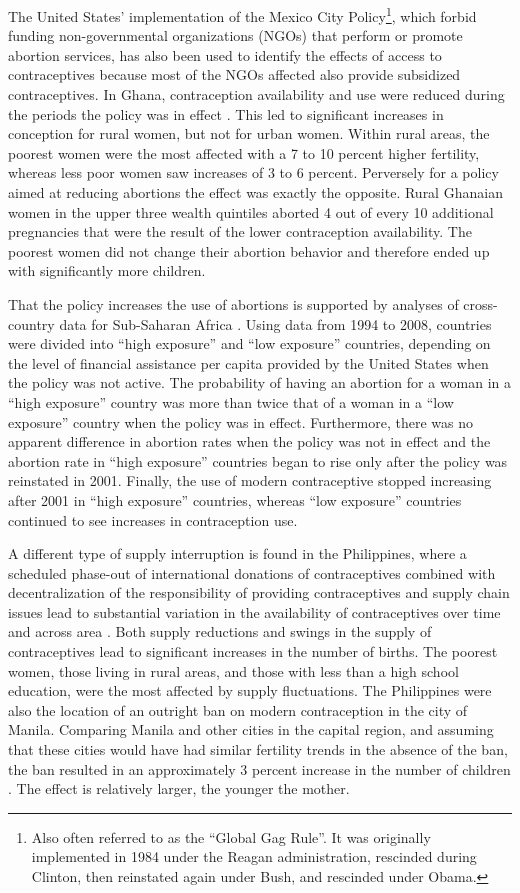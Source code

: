 \documentclass[letterpaper,12pt]{article}
\begin{document}
The United States' implementation of the Mexico City
Policy\footnote{Also often referred to as the ``Global Gag Rule''.
It was originally implemented in 1984 under the Reagan administration,
rescinded during Clinton, then reinstated again under Bush, and
rescinded under Obama.}, which forbid funding non-governmental
organizations (NGOs) that perform or promote abortion services, has also
been used to identify the effects of access to contraceptives because
most of the NGOs affected also provide subsidized contraceptives.
In Ghana, contraception availability and use were reduced during the
periods the policy was in effect \citep{Jones2015}.
This led to significant increases in conception for rural women, but not
for urban women.
Within rural areas, the poorest women were the most affected with a 7 to
10 percent higher fertility, whereas less poor women saw increases of 3
to 6 percent.
Perversely for a policy aimed at reducing abortions the effect was
exactly the opposite.
Rural Ghanaian women in the upper three wealth quintiles aborted 4 out
of every 10 additional pregnancies that were the result of the lower
contraception availability.
The poorest women did not change their abortion behavior and therefore
ended up with significantly more children.

That the policy increases the use of abortions is supported by analyses
of cross-country data for Sub-Saharan Africa \citep{Bendavid2011}.
Using data from 1994 to 2008, countries were divided into ``high
exposure'' and ``low exposure'' countries, depending on the level of
financial assistance per capita provided by the United States when the
policy was not active.
The probability of having an abortion for a woman in a ``high exposure''
country was more than twice that of a woman in a ``low exposure''
country when the policy was in effect.
Furthermore, there was no apparent difference in abortion rates when the
policy was not in effect and the abortion rate in ``high exposure''
countries began to rise only after the policy was reinstated in 2001.
Finally, the use of modern contraceptive stopped increasing after 2001
in ``high exposure'' countries, whereas ``low exposure'' countries
continued to see increases in contraception use.

A different type of supply interruption is found in the Philippines,
where a scheduled phase-out of international donations of contraceptives
combined with decentralization of the responsibility of providing
contraceptives and supply chain issues lead to substantial variation in
the availability of contraceptives over time and across area
\citep{Salas2014}.
Both supply reductions and swings in the supply of contraceptives lead
to significant increases in the number of births.
The poorest women, those living in rural areas, and those with less than
a high school education, were the most affected by supply fluctuations.
The Philippines were also the location of an outright ban on modern
contraception in the city of Manila.
Comparing Manila and other cities in the capital region, and assuming
that these cities would have had similar fertility trends in the absence
of the ban, the ban resulted in an approximately 3 percent increase in
the number of children \citep{Dumas2017}.
The effect is relatively larger, the younger the mother.
\end{document}
